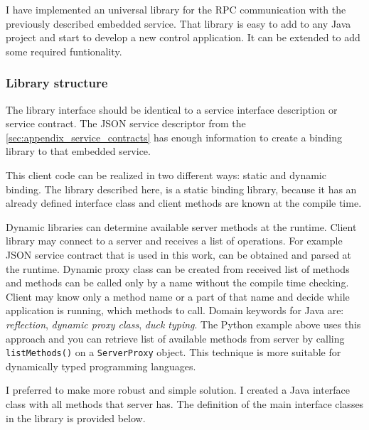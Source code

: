 I have implemented an universal library for the RPC communication with the
previously described embedded service. That library is easy to add to any Java
project and start to develop a new control application. 
It can be extended to add some required funtionality.
 
\subsubsection{Library structure}

The library interface should be identical to a service interface description
or service contract. The JSON service descriptor from the
\autoref{sec:appendix_service_contracts} has enough information to create a
binding library to that embedded service.

This client code can be realized in two different ways: static and dynamic binding.
The library described here, is a static binding library, because it has an already 
defined interface class and client methods are known at the compile time.

Dynamic libraries can determine available server methods at the runtime. Client
library may connect to a server and receives a list of operations. For example JSON
service contract that is used in this work, can be obtained and parsed at the runtime. Dynamic proxy
class can be created from received list of methods and methods can be called
only by a name without the compile time checking. Client may know only a method
name or a part of that name and decide while application is running, which
methods to call. Domain keywords for Java are: \textit{reflection}, \textit{dynamic proxy
class}, \textit{duck typing}. 
The Python example above uses this approach and
you can retrieve list of available methods from server by calling
\texttt{listMethods()} on a \texttt{ServerProxy} object. 
This technique is more suitable for dynamically typed programming languages. 

I preferred to make more robust and simple solution. I created a Java
interface class with all methods that server has. 
The definition of the main interface classes in the library is provided below.

